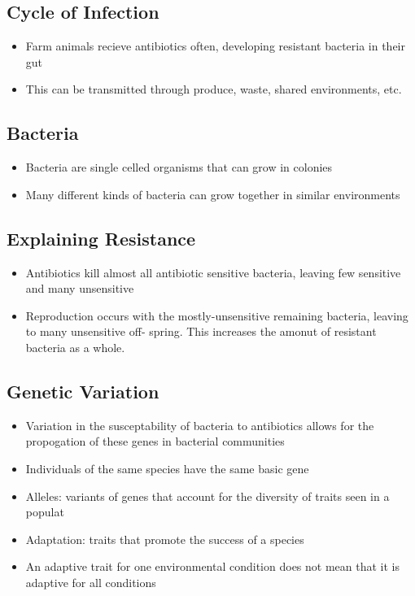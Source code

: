 \documentclass[11pt]{article}
\begin{document}
\subsection{Cycle of Infection}
\label{sec:orge7c71b1}
\begin{itemize}
\item Farm animals recieve antibiotics often, developing resistant bacteria in their gut
\item This can be transmitted through produce, waste, shared environments, etc.
\end{itemize}
\subsection{Bacteria}
\label{sec:orgab3b0f3}
\begin{itemize}
\item Bacteria are single celled organisms that can grow in colonies
\item Many different kinds of bacteria can grow together in similar environments
\end{itemize}
\subsection{Explaining Resistance}
\label{sec:org6e04aa5}
\begin{itemize}
\item Antibiotics kill almost all antibiotic sensitive bacteria, leaving few sensitive and many unsensitive
\item Reproduction occurs with the mostly-unsensitive remaining bacteria, leaving to many unsensitive off-
spring. This increases the amonut of resistant bacteria as a whole.
\end{itemize}
\subsection{Genetic Variation}
\label{sec:orga97e236}
\begin{itemize}
\item Variation in the susceptability of bacteria to antibiotics allows for the propogation of 
these genes in bacterial communities
\item Individuals of the same species have the same basic gene
\item Alleles: variants of genes that account for the diversity of traits seen in a populat
\item Adaptation: traits that promote the success of a species
\item An adaptive trait for one environmental condition does not mean that it is adaptive for all conditions
\end{itemize}
\end{document}
